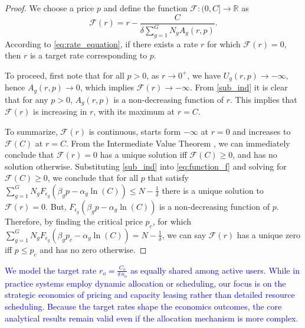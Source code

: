 \documentclass[12pt, draftclsnofoot, onecolumn]{IEEEtran}
\begin{document}
	\begin{proof}			
		We choose a price $p$ and define the function \( \mathcal{F}: (0,C] \rightarrow \mathbb{R} \) as
		\begin{equation}
			\mathcal{F}(r) = r - \frac{C}{\delta \sum_{g=1}^{G} N_g A_g(r, p)}.
			\label{eq:function_f}
		\end{equation}
		According to \eqref{eq:rate_equation}, if there exists a rate $r$ for which \( \mathcal{F}(r) = 0 \), then $r$ is a target rate corresponding to $p$. 
		
		
		To proceed, first note that for all $p> 0$, as \( r \to 0^+ \), we have $U_g(r, p) \to -\infty$, hence  \( A_g(r,p) \to 0 \), which implies \( \mathcal{F}(r) \to -\infty \). From \eqref{sub_ind} it is clear that for any $p>0$, $A_g(r,p)$ is a non-decreasing function of $r$. This implies that $\mathcal{F}(r)$ is  increasing in $r$, with its maximum at $r=C$. 
		
		To summarize, $\mathcal{F}(r)$ is continuous, starts form $-\infty$ at $r=0$ and  increases to $\mathcal{F}(C)$ at $r=C$. From the Intermediate Value Theorem \cite{Book-Rudin}, we can immediately conclude that $\mathcal{F}(r)=0$ has a unique solution iff  $\mathcal{F}(C)\geq 0$, and has no solution otherwise. Substituting \eqref{sub_ind} into \eqref{eq:function_f} and solving for $\mathcal{F}(C)\geq 0$, we conclude that for all $p$ that satisfy $\sum_{g=1}^{G}N_g F_{\epsilon_g}\left(\beta_g p-\alpha_g \ln(C)\right)\leq N-\frac{1}{\delta}$ there is a unique solution to $\mathcal{F}(r)=0$. But, $F_{\epsilon_g}\left(\beta_g p-\alpha_g \ln(C)\right)$ is a non-decreasing function of $p$. Therefore, by finding the critical price $p_c$, for which $\sum_{g=1}^{G}N_g F_{\epsilon_g}\left(\beta_g p_c-\alpha_g \ln(C)\right)= N-\frac{1}{\delta}$, we can say $\mathcal{F}(r)$ has a unique zero iff $p\leq p_c$ and has no zero otherwise. 		
	\end{proof}

	\begin{remark}
		\textcolor{blue}{We model the target rate 
			$r_o = \frac{C_o}{\delta\,n_o}$
			as equally shared among active users. While in practice systems employ dynamic allocation or scheduling, our focus is on the strategic economics of pricing and capacity leasing rather than detailed resource scheduling. Because the target rates shape the economics outcomes, the core analytical results remain valid even if the allocation mechanism is more complex.}
	\end{remark}
	
\end{document}

